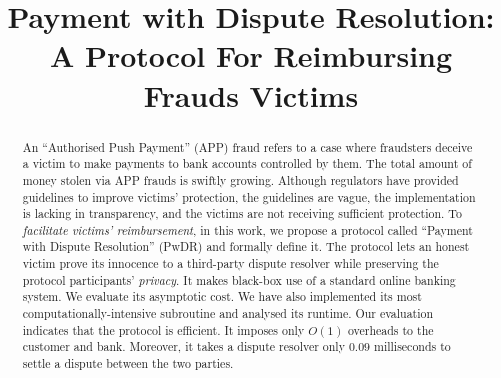 \documentclass[compsoc, conference, a4paper, 10pt, times]{IEEEtran}
\begin{document}
\title{Payment with Dispute Resolution: \\ A Protocol For Reimbursing Frauds Victims}


\iffalse
\author{\IEEEauthorblockN{1\textsuperscript{st} Given Names Surname}
\IEEEauthorblockA{\textit{Affiliation} \\
City, Country \\
email address or website URL}
\and
\IEEEauthorblockN{2\textsuperscript{nd} Given Names Surname}
\IEEEauthorblockA{\textit{Affiliation} \\
City, Country \\
email address or website URL}
\and
\IEEEauthorblockN{3\textsuperscript{rd} Given Names Surname}
\IEEEauthorblockA{\textit{Affiliation} \\
City, Country \\
email address or website URL}
}
\fi

\maketitle

\begin{abstract}
An ``Authorised Push Payment'' (APP) fraud refers to a case where fraudsters deceive a victim to make payments to bank accounts controlled by them.  The total amount of money stolen via APP frauds is swiftly growing. Although regulators have provided guidelines to improve victims’ protection, the guidelines are vague, the implementation is lacking in transparency, and the victims are not receiving sufficient protection. To  \emph{facilitate victims' reimbursement}, in this work, we propose a protocol called  ``Payment with Dispute Resolution'' (PwDR) and formally define it. The protocol lets an honest victim prove its innocence to a third-party dispute resolver while preserving the protocol participants' \emph{privacy}. It makes black-box use of a standard online banking system. We evaluate its asymptotic cost. We have also implemented its most computationally-intensive subroutine and analysed its runtime. Our evaluation indicates that the protocol is efficient. It imposes only $O(1)$ overheads to the customer and bank.  Moreover, it takes a dispute resolver only $0.09$ milliseconds to settle a dispute between the two parties.
\end{abstract}
\end{document}
